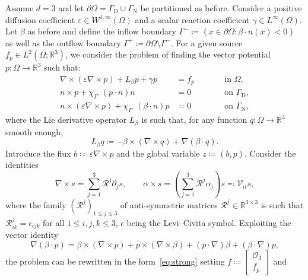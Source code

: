 \documentclass[11pt,a4paper]{article}
\theoremstyle{plain}
\theoremstyle{remark}
\theoremstyle{definition}
\newcommand{\Real}{\mathbb{R}}
\newcommand{\dirichlet}{\mathrm{D}}
\newcommand{\neumann}{\mathrm{N}}
\begin{document}
Assume $d = 3$ and let $\partial\Omega=\Gamma_\dirichlet\cup\Gamma_\neumann$ be partitioned as before.
Consider a positive diffusion coefficient $\varepsilon\in W^{1,\infty}(\Omega)$ and a scalar reaction coefficient $\gamma\in L^\infty(\Omega)$.
Let $\beta$ as before and define the inflow boundary $\Gamma^{-} \coloneqq  \left\{x\in\partial\Omega: \beta\cdot n(x) <0 \right\}$ as well as the outflow boundary $\Gamma^{+} \coloneqq \partial\Omega\setminus\Gamma^{-}$.
For a given source $f_p \in L^2(\Omega;\Real^3)$, we consider the problem of finding the vector potential $p:\Omega\to\Real^3$ such that:
\begin{equation}\label{eq:vector_DAR}
  \begin{alignedat}{2}
    \nabla\times(\varepsilon\nabla\times p) + L_\beta p + \gamma p
    &= f_p
    &\qquad& \text{in $\Omega$},
    \\
    n\times p + \chi_{\Gamma^-} (p\cdot n) n
    &= 0
    &\qquad& \text{on $\Gamma_\dirichlet$},
    \\
    n \times(\varepsilon \nabla \times p) + \chi_{\Gamma^-}(\beta\cdot n) p
    &= 0
    &\qquad& \text{on $\Gamma_\neumann$},
  \end{alignedat}
\end{equation}
where the Lie derivative operator $L_\beta$ is such that, for any function $q : \Omega \to \Real^3$ smooth enough,
\[
L_\beta q \coloneqq - \beta \times (\nabla \times q) + \nabla(\beta\cdot q).
\]
Introduce the flux $b \coloneqq \varepsilon\nabla \times p$ and the global variable $z \coloneqq (b,p)$.
Consider the identities
\[
\nabla \times s = \sum_{j=1}^{3} \mathcal{R}^j \partial_j s,
\qquad
\alpha\times s = \left(
\sum_{j=1}^{3} \mathcal{R}^j \alpha_j
\right) s \eqqcolon \mathcal{V}_\alpha s,
\]
where the family $(\mathcal{R}^j)_{1\le j\le 3}$ of anti-symmetric matrices $\mathcal{R}^j \in \Real^{3 \times 3}$ is such that $\mathcal{R}^{j}_{ik} = \epsilon_{ijk}$ for all $1 \le i,j,k\le 3$, $\epsilon$ being the Levi--Civita symbol.
Exploiting the vector identity
\[
\nabla(\beta\cdot p) = \beta\times(\nabla\times p) + p \times(\nabla\times \beta) + (p \cdot \nabla) \beta + (\beta \cdot \nabla) p,
\]
the problem can be rewritten in the form~\eqref{eq:strong} setting
$f \coloneqq
\begin{bmatrix}
  \mathcal{O}_3 \\ f_p
\end{bmatrix}$ and
\end{document}
